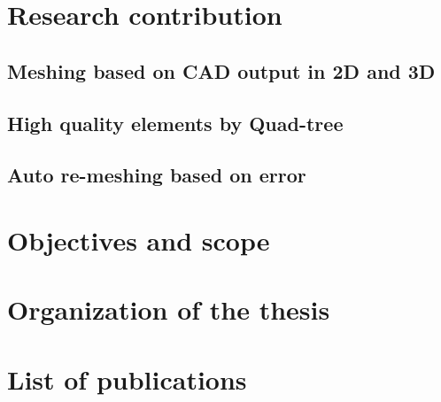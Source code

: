 \section{Research contribution}

    \subsection{Meshing based on CAD output in 2D and 3D}

    \subsection{High quality elements by Quad-tree}

    \subsection{Auto re-meshing based on error}

\section{Objectives and scope}

\section{Organization of the thesis}

\section{List of publications}


